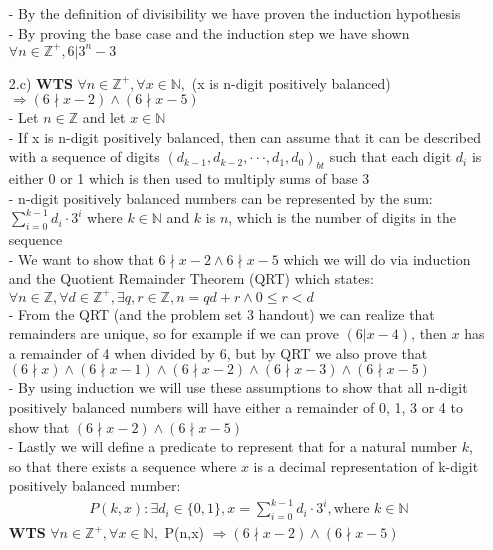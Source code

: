 \documentclass[20pt]{article}
\begin{document}
\begin{enumerate}
- By the definition of divisibility we have proven the induction hypothesis\\
- By proving the base case and the induction step we have shown $\forall n\in\mathbb{Z}^+,6|3^n-3$\\

\newpage
\item[2.c)]\textbf{WTS} $\forall n \in\mathbb{Z}^+, \forall x \in\mathbb{N},$ (x is n-digit positively balanced) $\Rightarrow (6\nmid x-2) \land (6\nmid x-5)$\\
- Let $n \in\mathbb{Z}$ and let $x \in\mathbb{N}$\\
- If x is n-digit positively balanced, then can assume that it can be described with a sequence of digits $(d_{k - 1},d_{k-2},\cdot\cdot\cdot ,d_{1},d_{0})_{bt}$ such that each digit $d_i$ is either 0 or 1 which is then used to multiply sums of base 3\\
- n-digit positively balanced numbers can be represented by the sum: $\sum_{i = 0}^{k-1}d_i\cdot 3^i$ where $k \in\mathbb{N}$ and $k$ is $n$, which is the number of digits in the sequence\\
- We want to show that $6\nmid x-2 \land 6\nmid x-5$ which we will do via induction and the Quotient Remainder Theorem (QRT) which states: $\forall n \in\mathbb{Z}, \forall d \in\mathbb{Z}^+,\exists q,r \in\mathbb{Z}, n = qd + r \land 0\leq r < d$\\
- From the QRT (and the problem set 3 handout) we can realize that remainders are unique, so for example if we can prove $(6|x-4)$, then $x$ has a remainder of 4 when divided by 6, but by QRT we also prove that $(6\nmid x) \land (6\nmid x-1) \land (6\nmid x-2) \land (6\nmid x-3) \land (6\nmid x-5)$\\
- By using induction we will use these assumptions to show that all n-digit positively balanced numbers will have either a remainder of 0, 1, 3 or 4 to show that $(6\nmid x-2) \land (6\nmid x-5)$\\
- Lastly we will define a predicate to represent that for a natural number $k$, so that there exists a sequence where $x$ is a decimal representation of k-digit positively balanced number:\\
\begin{align*}
    P(k,x): \exists d_i \in \{0,1\}, x = \sum_{i = 0}^{k-1}d_i\cdot 3^i, \text{where } k\in\mathbb{N}
\end{align*}
\textbf{WTS} $\forall n \in\mathbb{Z}^+, \forall x \in\mathbb{N},$ P(n,x) $\Rightarrow (6\nmid x-2) \land (6\nmid x-5)$\\


\end{enumerate}
\end{document}
